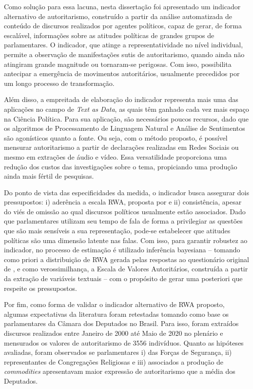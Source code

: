 \documentclass[
12pt,				%
openright,			%
twoside,			%
a4paper,			%
english,			%
french,				%
spanish,			%
brazil				%
]{abntex2}
\begin{document}
Como solução para essa lacuna, nesta dissertação foi apresentado um indicador alternativo de autoritarismo, construído a partir da análise automatizada de conteúdo de discursos realizados por agentes políticos, capaz de gerar, de forma escalável, informações sobre as atitudes políticas de grandes grupos de parlamentares. O indicador, que atinge a representatividade no nível individual, permite a observação de manifestações sutis de autoritarismo, quando ainda não atingiram grande magnitude ou tornaram-se perigosas. Com isso, possibilita antecipar a emergência de movimentos autoritários, usualmente precedidos por um longo processo de transformação.  

Além disso, a empreitada de elaboração do indicador representa mais uma das aplicações no campo de \emph{Text as Data}, as quais têm ganhado cada vez mais espaço na Ciência Política. Para sua aplicação, são necessários poucos recursos, dado que os algoritmos de Processamento de Linguagem Natural e Análise de Sentimentos são agonísticos quanto a fonte. Ou seja, com o método proposto, é possível mensurar autoritarismo a partir de declarações realizadas em Redes Sociais ou mesmo em extrações de áudio e vídeo. Essa versatilidade proporciona uma redução dos custos das investigações sobre o tema, propiciando uma produção ainda mais fértil de pesquisas. 

Do ponto de vista das especificidades da medida, o indicador busca assegurar dois pressupostos: i) aderência a escala RWA, proposta por  e ii) consistência, apesar do viés de omissão ao qual discursos políticos usualmente estão associados. Dado que parlamentares utilizam seu tempo de fala de forma a privilegiar as questões que são mais sensíveis a sua representação, pode-se estabelecer que atitudes políticas são uma dimensão latente nas falas. Com isso, para garantir robustez ao indicador, no processo de estimação é utilizado inferência bayesiana -- tomando como priori a distribuição de RWA gerada pelas respostas ao questionário original de , e como verossimilhança, a Escala de Valores Autoritários, construída a partir da extração de variáveis textuais -- com o propósito de gerar uma posteriori que respeite os pressupostos.

Por fim, como forma de validar o indicador alternativo de RWA proposto, algumas expectativas da literatura foram retestadas tomando como base os parlamentares da Câmara dos Deputados no Brasil. Para isso, foram extraídos discursos realizados entre Janeiro de 2000 até Maio de 2020 no plenário e mensurados os valores de autoritarismo de 3556 indivíduos. Quanto as hipóteses avaliadas, foram observados se parlamentares i) das Forças de Segurança, ii) representantes de Congregações Religiosas e iii) associados a produção de \emph{commodities} apresentavam maior expressão de autoritarismo que a média dos Deputados.
\end{document}
